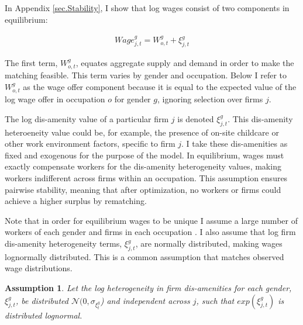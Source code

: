 \documentclass[12pt]{article}
\newtheorem{assumption}{Assumption}
\begin{document}
In Appendix \ref{sec.Stability}, I show that log wages consist of two components in equilibrium:

\begin{align} \label{wages}
Wage^g_{j,t} = W^g_{o,t} + \xi^g_{j,t}
\end{align}

The first term, $W^g_{o,t}$, equates aggregate supply and demand in order to make the matching feasible. This term varies by gender and occupation. Below I refer to $W^g_{o,t} $ as the wage offer component because it is equal to the expected value of the log wage offer in occupation $o$ for gender $g$, ignoring selection over firms $j$.

The log dis-amenity value of a particular firm $j$ is denoted $\xi^g_{j,t}$. This dis-amenity heteroeneity value could be, for example, the presence of on-site childcare or other work environment factors, specific to firm $j$. I take these dis-amenities as fixed and exogenous for the purpose of the model. In equilibrium, wages must exactly compensate workers for the dis-amenity heterogeneity values, making workers indifferent across firms within an occupation. This assumption ensures pairwise stability, meaning that after optimization, no workers or firms could achieve a higher surplus by rematching. 





Note that in order for equilibrium wages to be unique I assume a large number of workers of each gender and firms in each occupation \cite{Galichon2015}.  I also assume that log firm dis-amenity heterogeneity terms, $\xi^g_{j,t}$, are normally distributed, making wages lognormally distributed. This is a common assumption that matches observed wage distributions.

\begin{assumption} \label{lognormal}
Let the log heterogeneity in firm dis-amenities for each gender, $\xi^g_{j,t}$, be distributed $\mathcal{N}(0, \sigma_{\xi^g_t}$) and independent across $j$, such that $exp(\xi^g_{j,t})$ is distributed lognormal.
\end{assumption}
\end{document}
